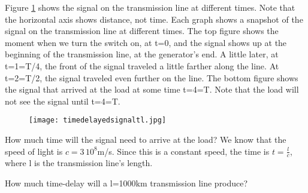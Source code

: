 \documentclass{ximera}
\begin{document}
Figure \ref{delayedsig} shows the signal on the transmission line at different times. Note that the horizontal axis shows distance, not time. Each graph shows a snapshot of the signal on the transmission line at different times. The top figure shows the moment when we turn the switch on, at t=0, and the signal shows up at the beginning of the transmission line, at the generator's end. A little later, at t=1=T/4, the front of the signal traveled a little farther along the line. At t=2=T/2, the signal traveled even further on the line. The bottom figure shows the signal that arrived at the load at some time t=4=T. Note that the load will not see the signal until t=4=T. 



\begin{figure}[htbp]
\begin{center}
\texttt{[image: timedelayedsignaltl.jpg]}
\end{center}
\label{delayedsig}
\end{figure}

How much time will the signal need to arrive at the load? We know that the speed of light is $c=3\,10^8$m/s. Since this is a constant speed, the time is $t=\frac{l}{c}$, where l is the transmission line's length.

\begin{question}  
How much time-delay will a l=1000km transmission line produce?  
\begin{multipleChoice}  
\end{multipleChoice}  
\end{question} 
\end{document}
